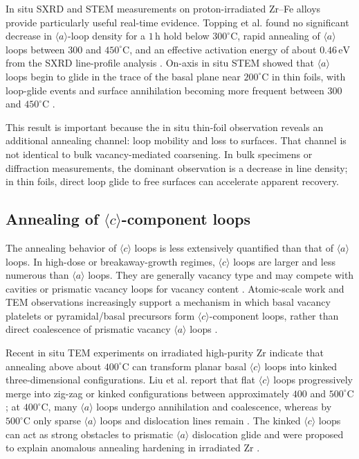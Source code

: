 \documentclass[11pt]{article}
\newcommand{\degreeC}{^\circ\mathrm{C}}
\begin{document}
In situ SXRD and STEM measurements on proton-irradiated Zr--Fe alloys provide particularly useful real-time evidence.  Topping et al. found no significant decrease in $\langle a\rangle$-loop density for a $1\,\mathrm{h}$ hold below $300\degreeC$, rapid annealing of $\langle a\rangle$ loops between $300$ and $450\degreeC$, and an effective activation energy of about $0.46\,\mathrm{eV}$ from the SXRD line-profile analysis \citep{Topping2018}.  On-axis in situ STEM showed that $\langle a\rangle$ loops begin to glide in the trace of the basal plane near $200\degreeC$ in thin foils, with loop-glide events and surface annihilation becoming more frequent between $300$ and $450\degreeC$ \citep{Topping2018}.

This result is important because the in situ thin-foil observation reveals an additional annealing channel: loop mobility and loss to surfaces.  That channel is not identical to bulk vacancy-mediated coarsening.  In bulk specimens or diffraction measurements, the dominant observation is a decrease in line density; in thin foils, direct loop glide to free surfaces can accelerate apparent recovery.

\subsection{Annealing of $\langle c\rangle$-component loops}

The annealing behavior of $\langle c\rangle$ loops is less extensively quantified than that of $\langle a\rangle$ loops.  In high-dose or breakaway-growth regimes, $\langle c\rangle$ loops are larger and less numerous than $\langle a\rangle$ loops.  They are generally vacancy type and may compete with cavities or prismatic vacancy loops for vacancy content \citep{Griffiths1988,Holt1988,Christiaen2019,Liu2020}.  Atomic-scale work and TEM observations increasingly support a mechanism in which basal vacancy platelets or pyramidal/basal precursors form $\langle c\rangle$-component loops, rather than direct coalescence of prismatic vacancy $\langle a\rangle$ loops \citep{Christiaen2019,Liu2020}.

Recent in situ TEM experiments on irradiated high-purity Zr indicate that annealing above about $400\degreeC$ can transform planar basal $\langle c\rangle$ loops into kinked three-dimensional configurations.  Liu et al. report that flat $\langle c\rangle$ loops progressively merge into zig-zag or kinked configurations between approximately $400$ and $500\degreeC$; at $400\degreeC$, many $\langle a\rangle$ loops undergo annihilation and coalescence, whereas by $500\degreeC$ only sparse $\langle a\rangle$ loops and dislocation lines remain \citep{Liu2025}.  The kinked $\langle c\rangle$ loops can act as strong obstacles to prismatic $\langle a\rangle$ dislocation glide and were proposed to explain anomalous annealing hardening in irradiated Zr \citep{Liu2025}.
\end{document}
